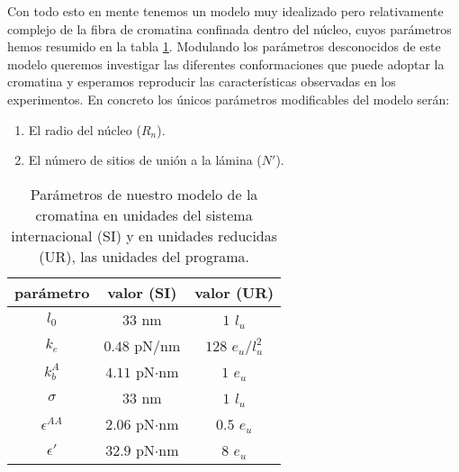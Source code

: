 Con todo esto en mente tenemos un modelo muy idealizado pero relativamente complejo de la fibra de cromatina confinada dentro del núcleo, cuyos parámetros hemos resumido en la tabla \ref{tab:parameters}. Modulando los parámetros desconocidos de este modelo queremos investigar las diferentes conformaciones que puede adoptar la cromatina y esperamos reproducir las características observadas en los experimentos. En concreto los únicos parámetros modificables del modelo serán:
\begin{enumerate}
    \item El radio del núcleo ($R_n$).
    \item El número de sitios de unión a la lámina ($N'$).
\end{enumerate}

\begin{table}
    \centering
    \begin{tabular}{c c c}
        \toprule
        parámetro       & valor (SI)         & valor (UR)          \\
        \midrule
        $l_0$           & $33$ nm            & $1$ $l_u$           \\
        $k_e$           & $0.48$ pN/nm       & $128$ $e_u$/$l_u^2$ \\
        $k_b^A$         & $4.11$ pN$\cdot$nm & $1$ $e_u$           \\
        $\sigma$        & $33$ nm            & $1$ $l_u$           \\
        $\epsilon^{AA}$ & $2.06$ pN$\cdot$nm & $0.5$ $e_u$         \\
        $\epsilon'$     & $32.9$ pN$\cdot$nm & $8$ $e_u$           \\
        \bottomrule
    \end{tabular}
    \caption{Parámetros de nuestro modelo de la cromatina en unidades del sistema internacional (SI) y en unidades reducidas (UR), las unidades del programa.}
    \label{tab:parameters}
\end{table}
